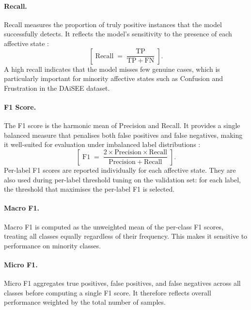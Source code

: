 \paragraph{Recall.}
Recall measures the proportion of truly positive instances that the model successfully detects. It reflects the model's sensitivity to the presence of each affective state \cite{gothwal_vibed-net_2025}:
\begin{equation}
\left[\; \mathrm{Recall} \;=\; \frac{\mathrm{TP}}{\mathrm{TP} + \mathrm{FN}} \;\right].
\label{eq:recall}
\end{equation}
A high recall indicates that the model misses few genuine cases, which is particularly important for minority affective states such as Confusion and Frustration in the \ac{DAiSEE} dataset.

\paragraph{F1 Score.}
The F1 score is the harmonic mean of Precision and Recall. It provides a single balanced measure that penalises both false positives and false negatives, making it well-suited for evaluation under imbalanced label distributions \cite{gothwal_vibed-net_2025}:
\begin{equation}
\left[\; \mathrm{F1} \;=\; \frac{2 \times \mathrm{Precision} \times \mathrm{Recall}}{\mathrm{Precision} + \mathrm{Recall}} \;\right].
\label{eq:f1}
\end{equation}
Per-label F1 scores are reported individually for each affective state. They are also used during per-label threshold tuning on the validation set: for each label, the threshold that maximises the per-label F1 is selected.
\paragraph{Macro F1.}
Macro F1 is computed as the unweighted mean of the per-class F1 scores, treating all classes equally regardless of their frequency. This makes it sensitive to performance on minority classes. \cite{scikit_learn}

\paragraph{Micro F1.}
Micro F1 aggregates true positives, false positives, and false negatives across all classes before computing a single F1 score. It therefore reflects overall performance weighted by the total number of samples. \cite{scikit_learn}

